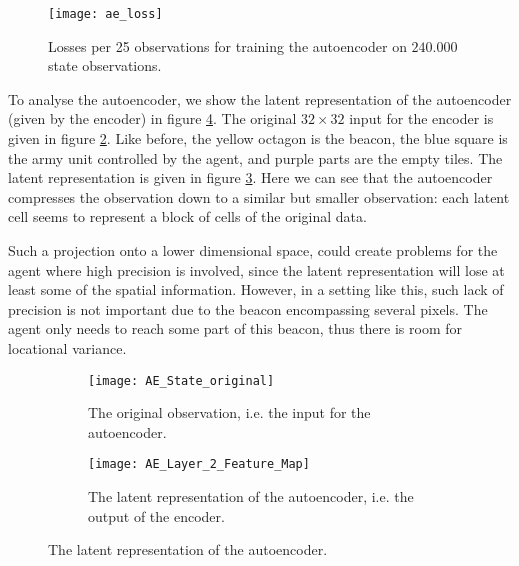 \begin{figure}[h!]
    \centering
    \texttt{[image: ae\_loss]}
    \caption{Losses per 25 observations for training the autoencoder on $240.000$ state observations.}
    \label{fig:ae-loss}
\end{figure}

To analyse the autoencoder, we show the latent representation of the autoencoder (given by the encoder) in figure \ref{fig:ae-featuremap}. The original $32 \times 32$ input for the encoder is given in figure \ref{fig:ae-featuremap-original}. Like before, the yellow octagon is the beacon, the blue square is the army unit controlled by the agent, and purple parts are the empty tiles. The latent representation is given in figure \ref{fig:ae-featuremap-layer2}. Here we can see that the autoencoder compresses the observation down to a similar but smaller observation: each latent cell seems to represent a block of cells of the original data. 

Such a projection onto a lower dimensional space, could create problems for the agent where high precision is involved, since the latent representation will lose at least some of the spatial information. However, in a setting like this, such lack of precision is not important due to the beacon encompassing several pixels. The agent only needs to reach some part of this beacon, thus there is room for locational variance. 

\begin{figure}[h!]
	\centering
	\begin{subfigure}[b]{0.30\textwidth}
		\texttt{[image: AE\_State\_original]}
		\caption{The original observation, i.e. the input for the autoencoder.}
		\label{fig:ae-featuremap-original} 
	\end{subfigure}\hfill
	\begin{subfigure}[b]{0.30\textwidth}
		\texttt{[image: AE\_Layer\_2\_Feature\_Map]}
		\caption{The latent representation of the autoencoder, i.e. the output of the encoder.}
		\label{fig:ae-featuremap-layer2}
	\end{subfigure}
	\caption{The latent representation of the autoencoder.}
	\label{fig:ae-featuremap}
\end{figure}

